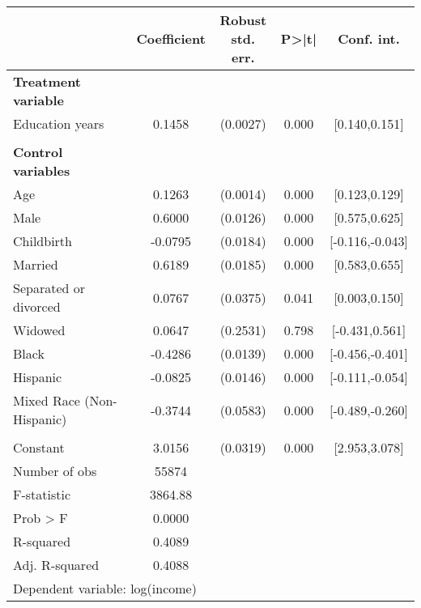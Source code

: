{
\def\sym#1{\ifmmode^{#1}\else\(^{#1}\)\fi}
\begin{tabular}{l*{1}{cccc}}
\toprule
                    & Coefficient&\shortstack{Robust\\std. err.}&       P>|t|&  Conf. int.\\
\midrule
\textbf{Treatment variable}&            &            &            &            \\
Education years     &      0.1458&    (0.0027)&       0.000&[0.140,0.151]\\
\\ \textbf{Control variables}&            &            &            &            \\
Age                 &      0.1263&    (0.0014)&       0.000&[0.123,0.129]\\
Male                &      0.6000&    (0.0126)&       0.000&[0.575,0.625]\\
Childbirth          &     -0.0795&    (0.0184)&       0.000&[-0.116,-0.043]\\
Married             &      0.6189&    (0.0185)&       0.000&[0.583,0.655]\\
Separated or divorced&      0.0767&    (0.0375)&       0.041&[0.003,0.150]\\
Widowed             &      0.0647&    (0.2531)&       0.798&[-0.431,0.561]\\
Black               &     -0.4286&    (0.0139)&       0.000&[-0.456,-0.401]\\
Hispanic            &     -0.0825&    (0.0146)&       0.000&[-0.111,-0.054]\\
Mixed Race (Non-Hispanic)&     -0.3744&    (0.0583)&       0.000&[-0.489,-0.260]\\
                    &            &            &            &            \\
Constant            &      3.0156&    (0.0319)&       0.000&[2.953,3.078]\\
\midrule
Number of obs       &       55874&            &            &            \\
F-statistic         &     3864.88&            &            &            \\
Prob > F            &      0.0000&            &            &            \\
R-squared           &      0.4089&            &            &            \\
Adj. R-squared      &      0.4088&            &            &            \\
\bottomrule
\multicolumn{5}{l}{\footnotesize Dependent variable: log(income)}\\
\end{tabular}
}
